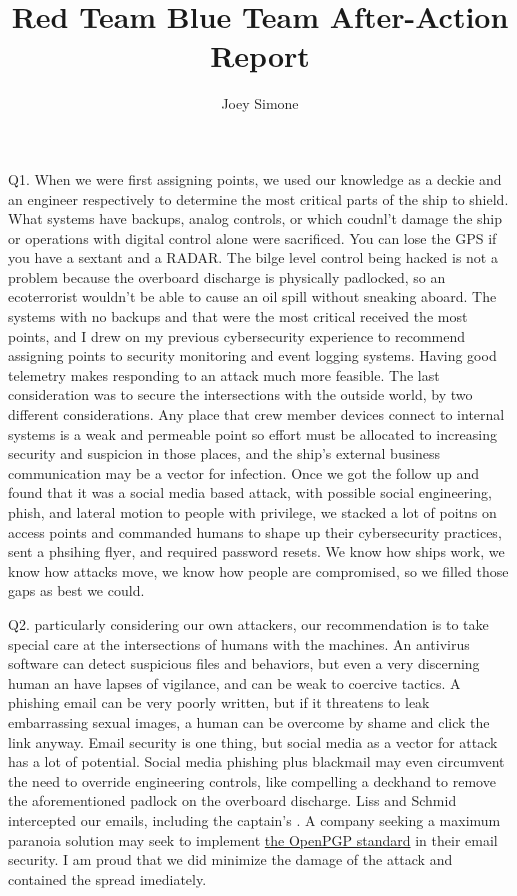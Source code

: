 \documentclass{article}[letterpaper,12pt]
\author{Joey Simone}
\title{Red Team Blue Team After-Action Report}
\begin{document}
\doublespace
\maketitle
Q1. When we were first assigning points, we used our knowledge as a deckie and an engineer respectively to determine the most critical parts of the ship to shield. What systems have backups, analog controls, or which coudnl't damage the ship or operations with digital control alone were sacrificed. You can lose the GPS if you have a sextant and a RADAR. The bilge level control being hacked is not a problem because the overboard discharge is physically padlocked, so an ecoterrorist wouldn't be able to cause an oil spill without sneaking aboard. The systems with no backups and that were the most critical received the most points, and I drew on my previous cybersecurity experience to recommend assigning points to security monitoring and event logging systems. Having good telemetry makes responding to an attack much more feasible. The last consideration was to secure the intersections with the outside world, by two different considerations. Any place that crew member devices connect to internal systems is a weak and permeable point so effort must be allocated to increasing security and suspicion in those places, and the ship's external business communication may be a vector for infection. Once we got the follow up and found that it was a social media based attack, with possible social engineering, phish, and lateral motion to people with privilege, we stacked a lot of poitns on access points and commanded humans to shape up their cybersecurity practices, sent a phsihing flyer, and required password resets. We know how ships work, we know how attacks move, we know how people are compromised, so we filled those gaps as best we could.


Q2. particularly considering our own attackers, our recommendation is to take special care at the intersections of humans with the machines. An antivirus software can detect suspicious files and behaviors, but even a very discerning human an have lapses of vigilance, and can be weak to coercive tactics. A phishing email can be very poorly written, but if it threatens to leak embarrassing sexual images, a human can be overcome by shame and click the link anyway. Email security is one thing, but social media as a vector for attack has a lot of potential. Social media phishing plus blackmail may even circumvent the need to override engineering controls, like compelling a deckhand to remove the aforementioned padlock on the overboard discharge. Liss and Schmid intercepted our emails, including the captain's . A company seeking a maximum paranoia solution may seek to implement \href{https://www.openpgp.org/}{the OpenPGP standard} in their email security. I am proud that we did minimize the damage of the attack and contained the spread imediately.  
\end{document}
